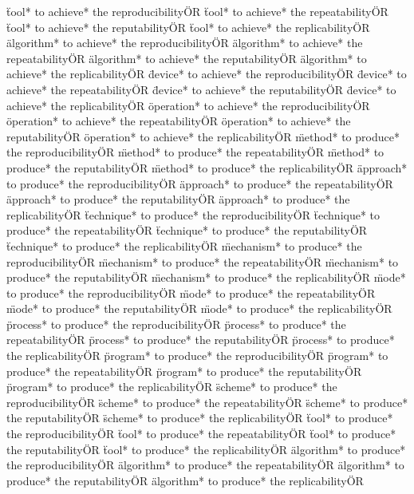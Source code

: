 \documentclass[
10pt, %
a4paper, %
oneside, %
headinclude,footinclude, %
BCOR5mm, %
]{scrartcl}
\begin{document}
\"tool* to achieve* the reproducibility\" OR \"tool* to achieve* the repeatability\" OR \"tool* to achieve* the reputability\" OR \"tool* to achieve* the replicability\" OR 
\"algorithm* to achieve* the reproducibility\" OR \"algorithm* to achieve* the repeatability\" OR \"algorithm* to achieve* the reputability\" OR \"algorithm* to achieve* the replicability\" OR 
\"device* to achieve* the reproducibility\" OR \"device* to achieve* the repeatability\" OR \"device* to achieve* the reputability\" OR \"device* to achieve* the replicability\" OR 
\"operation* to achieve* the reproducibility\" OR \"operation* to achieve* the repeatability\" OR \"operation* to achieve* the reputability\" OR \"operation* to achieve* the replicability\" OR 
\"method* to produce* the reproducibility\" OR \"method* to produce* the repeatability\" OR \"method* to produce* the reputability\" OR \"method* to produce* the replicability\" OR 
\"approach* to produce* the reproducibility\" OR \"approach* to produce* the repeatability\" OR \"approach* to produce* the reputability\" OR \"approach* to produce* the replicability\" OR 
\"technique* to produce* the reproducibility\" OR \"technique* to produce* the repeatability\" OR \"technique* to produce* the reputability\" OR \"technique* to produce* the replicability\" OR 
\"mechanism* to produce* the reproducibility\" OR \"mechanism* to produce* the repeatability\" OR \"mechanism* to produce* the reputability\" OR \"mechanism* to produce* the replicability\" OR 
\"mode* to produce* the reproducibility\" OR \"mode* to produce* the repeatability\" OR \"mode* to produce* the reputability\" OR \"mode* to produce* the replicability\" OR 
\"process* to produce* the reproducibility\" OR \"process* to produce* the repeatability\" OR \"process* to produce* the reputability\" OR \"process* to produce* the replicability\" OR 
\"program* to produce* the reproducibility\" OR \"program* to produce* the repeatability\" OR \"program* to produce* the reputability\" OR \"program* to produce* the replicability\" OR 
\"scheme* to produce* the reproducibility\" OR \"scheme* to produce* the repeatability\" OR \"scheme* to produce* the reputability\" OR \"scheme* to produce* the replicability\" OR 
\"tool* to produce* the reproducibility\" OR \"tool* to produce* the repeatability\" OR \"tool* to produce* the reputability\" OR \"tool* to produce* the replicability\" OR 
\"algorithm* to produce* the reproducibility\" OR \"algorithm* to produce* the repeatability\" OR \"algorithm* to produce* the reputability\" OR \"algorithm* to produce* the replicability\" OR 
\end{document}
